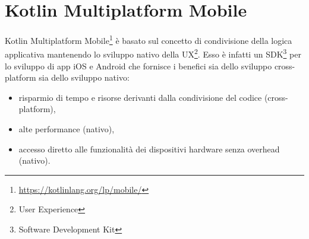 
\section{Kotlin Multiplatform Mobile}
Kotlin Multiplatform Mobile\footnote{\url{https://kotlinlang.org/lp/mobile/}} è basato sul concetto di condivisione della logica applicativa mantenendo lo sviluppo nativo della UX\footnote{User Experience}. Esso è infatti un SDK\footnote{Software Development Kit} per lo sviluppo di app iOS e Android che fornisce i benefici sia dello sviluppo cross-platform sia dello sviluppo nativo:
\begin{itemize}
    \item risparmio di tempo e risorse derivanti dalla condivisione del codice (cross-platform),
    \item alte performance (nativo),
    \item accesso diretto alle funzionalità dei dispositivi hardware senza overhead (nativo).
\end{itemize}

